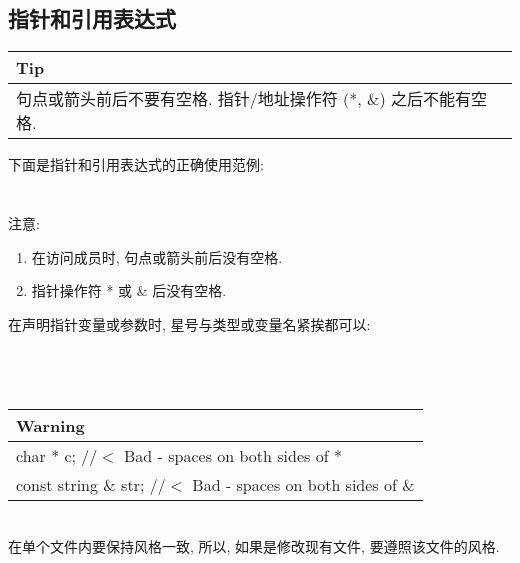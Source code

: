 \documentclass[a4paper,11pt,CJK]{article}
\begin{document}
\begin{CJK}{UTF8}{gbsn}
\subsection{指针和引用表达式}
\begin{table}[htbp]
\flushleft
\begin{tabular}{p{400pt}}
\toprule
\rowcolor[gray]{.8} Tip \\
\midrule
句点或箭头前后不要有空格. 指针/地址操作符 (*, \&) 之后不能有空格.\\
\bottomrule
\end{tabular}
\end{table}
下面是指针和引用表达式的正确使用范例:\\
\\
\\
注意:
\begin{enumerate}
\item
在访问成员时, 句点或箭头前后没有空格.
\item
指针操作符 * 或 \& 后没有空格.
\end{enumerate}
在声明指针变量或参数时, 星号与类型或变量名紧挨都可以:\\
\\
\\
\\
\begin{table}[htbp]
\flushleft
\begin{tabular}{p{400pt}}
\toprule
\rowcolor{red} Warning \\
\midrule
char * c;  //$<$ Bad - spaces on both sides of *\\
const string \& str;  //$<$ Bad - spaces on both sides of \&\\
\bottomrule
\end{tabular}
\end{table}
\\
\indent 在单个文件内要保持风格一致, 所以, 如果是修改现有文件, 要遵照该文件的风格.
\\


\end{CJK}
\end{document}
